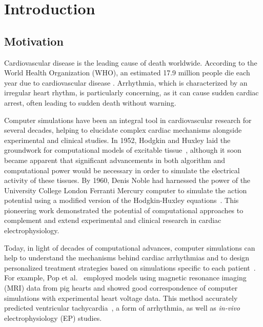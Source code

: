\chapter{Introduction}
\section{Motivation}


Cardiovascular disease is the leading cause of death worldwide. According to the World Health Organization (WHO), an estimated 17.9 million people die each year due to cardiovascular disease \cite{world-health-organisation-2021}. Arrhythmia, which is characterized by an irregular heart rhythm, is particularly concerning, as it can cause sudden cardiac arrest, often leading to sudden death without warning.





Computer simulations have been an integral tool in cardiovascular research for several decades, helping to elucidate complex cardiac mechanisms alongside experimental and clinical studies. In 1952, Hodgkin and Huxley laid the groundwork for computational models of excitable tissue~\cite{Hodgkin1952-ra}, although it soon became apparent that significant advancements in both algorithm and computational power would be necessary in order to simulate the electrical activity of these tissues. By 1960, Denis Noble had harnessed the power of the University College London Ferranti Mercury computer to simulate the action potential using a modified version of the Hodgkin-Huxley equations~\cite{Noble2012-tc}. This pioneering work demonstrated the potential of computational approaches to complement and extend experimental and clinical research in cardiac electrophysiology.

Today, in light of decades of computational advances, computer simulations can help to understand the mechanisms behind cardiac arrhythmias and to design personalized treatment strategies based on simulations specific to each patient~\cite{EP-review}.
For example, Pop et al.~\cite{pig} employed models using magnetic resonance imaging (MRI) data from pig hearts and showed good correspondence of computer simulations with experimental heart voltage data. This method accurately predicted ventricular tachycardia~\cite{VT}, a form of arrhythmia, as well as \textit{in-vivo} electrophysiology (EP) studies.

